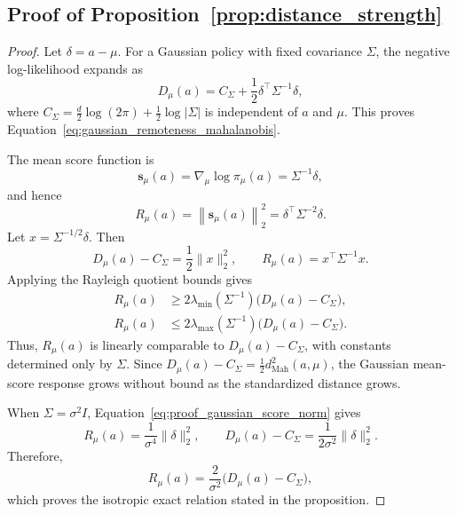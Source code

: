 \subsection{Proof of Proposition~\ref{prop:distance_strength}}
\label{app:distance_strength}

\begin{proof}
Let \(\delta=a-\mu\). For a Gaussian policy with fixed covariance
\(\Sigma\), the negative log-likelihood expands as
\[
    D_\mu(a)
    =
    C_\Sigma
    +
    \frac{1}{2}
    \delta^\top\Sigma^{-1}\delta,
\]
where
\(C_\Sigma=\frac{d}{2}\log(2\pi)+\frac{1}{2}\log|\Sigma|\)
is independent of \(a\) and \(\mu\). This proves
Equation~\eqref{eq:gaussian_remoteness_mahalanobis}.

The mean score function is
\begin{equation}
    \mathbf{s}_\mu(a)
    =
    \nabla_\mu\log\pi_\mu(a)
    =
    \Sigma^{-1}\delta,
\end{equation}
and hence
\begin{equation}
    R_\mu(a)
    =
    \left\|\mathbf{s}_\mu(a)\right\|_2^2
    =
    \delta^\top\Sigma^{-2}\delta.
    \label{eq:proof_gaussian_score_norm}
\end{equation}
Let \(x=\Sigma^{-1/2}\delta\). Then
\begin{equation}
    D_\mu(a)-C_\Sigma
    =
    \frac{1}{2}\|x\|_2^2,
    \qquad
    R_\mu(a)
    =
    x^\top\Sigma^{-1}x.
\end{equation}
Applying the Rayleigh quotient bounds gives
\begin{equation}
\begin{aligned}
    R_\mu(a)
    &\geq
    2\lambda_{\min}(\Sigma^{-1})
    \bigl(D_\mu(a)-C_\Sigma\bigr), \\
    R_\mu(a)
    &\leq
    2\lambda_{\max}(\Sigma^{-1})
    \bigl(D_\mu(a)-C_\Sigma\bigr).
\end{aligned}
\label{eq:proof_gaussian_score_remoteness_bounds}
\end{equation}
Thus, \(R_\mu(a)\) is linearly comparable to
\(D_\mu(a)-C_\Sigma\), with constants determined only by \(\Sigma\).
Since \(D_\mu(a)-C_\Sigma=\frac12 d_{\mathrm{Mah}}^2(a,\mu)\),
the Gaussian mean-score response grows without bound as the standardized
distance grows.

When \(\Sigma=\sigma^2I\), Equation~\eqref{eq:proof_gaussian_score_norm}
gives
\[
    R_\mu(a)
    =
    \frac{1}{\sigma^4}\|\delta\|_2^2,
    \qquad
    D_\mu(a)-C_\Sigma
    =
    \frac{1}{2\sigma^2}\|\delta\|_2^2.
\]
Therefore,
\[
    R_\mu(a)
    =
    \frac{2}{\sigma^2}
    \bigl(D_\mu(a)-C_\Sigma\bigr),
\]
which proves the isotropic exact relation stated in the proposition.


\end{proof}
